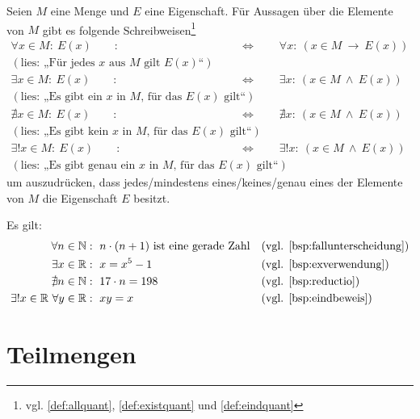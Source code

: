 \begin{nota}[*] \label{beschraenktquant}
    Seien $M$ eine Menge und $E$ eine Eigenschaft. Für Aussagen über die Elemente von $M$ gibt es folgende Schreibweisen\footnote{vgl. \cref{def:allquant}, \cref{def:existquant} und \cref{def:eindquant}}
    \begin{align*}
        \forall x\in M:\ E(x) \qquad :& \Leftrightarrow\qquad \forall x:\ (x\in M\ \to\ E(x))  \\
        (\text{lies: „Für jedes $x$ aus $M$ gilt $E(x)$“}) & \\[0.5em]
        \exists x\in M:\ E(x) \qquad :& \Leftrightarrow\qquad \exists x:\ (x\in M\ \land\ E(x))  \\
        (\text{lies: „Es gibt ein $x$ in $M$, für das $E(x)$ gilt“}) & \\[0.5em]
        \nexists x\in M:\ E(x) \qquad :& \Leftrightarrow\qquad \nexists x:\ (x\in M\ \land\ E(x))  \\
        (\text{lies: „Es gibt kein $x$ in $M$, für das $E(x)$ gilt“}) & \\[0.5em]
        \exists ! x\in M :\ E(x) \qquad :& \Leftrightarrow\qquad \exists ! x:\ (x\in M\ \land\ E(x)) \\ (\text{lies: „Es gibt genau ein $x$ in $M$, für das $E(x)$ gilt“})
    \end{align*}
    um auszudrücken, dass jedes/mindestens eines/keines/genau eines der Elemente von $M$ die Eigenschaft $E$ besitzt.
\end{nota}


\begin{bsp}[*]
    Es gilt:
    \begin{align*}
        \forall n\in \N &:\ n\cdot (n+1)\ \text{ist eine gerade Zahl} && (\text{vgl. \cref{bsp:fallunterscheidung}})\\
        \exists x\in \R &:\ x=x^5-1 && (\text{vgl. \cref{bsp:exverwendung}})\\
        \nexists n\in \N &:\ 17\cdot n = 198 && (\text{vgl. \cref{bsp:reductio}})\\ 
        \exists ! x\in \R \ \forall y\in \R & :\ xy=x &&(\text{vgl. \cref{bsp:eindbeweis}})
    \end{align*}
\end{bsp}





\section{Teilmengen}


